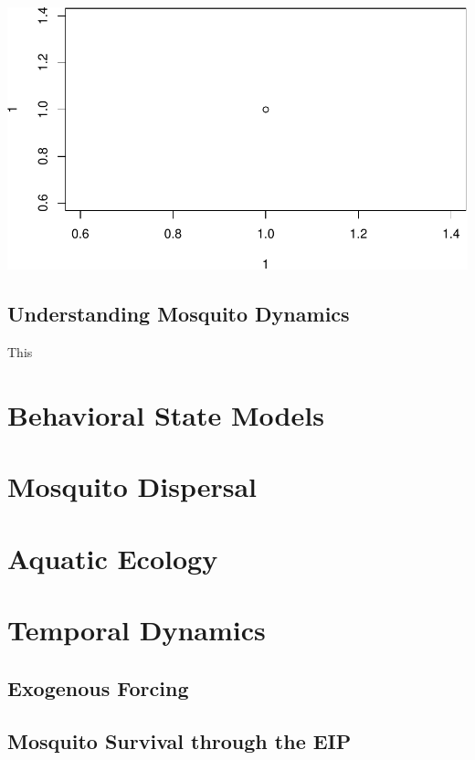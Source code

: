 \documentclass[
]{book}
\begin{document}
\includegraphics{docs/figs/test-1.pdf}

\section{Understanding Mosquito Dynamics}\label{understanding-mosquito-dynamics}

This

\chapter{Behavioral State Models}\label{behavioral-state-models}

\chapter{Mosquito Dispersal}\label{mosquito-dispersal}

\chapter{Aquatic Ecology}\label{aquatic-ecology}

\chapter{Temporal Dynamics}\label{temporal-dynamics}

\section{Exogenous Forcing}\label{exogenous-forcing-2}

\section{Mosquito Survival through the EIP}\label{mosquito-survival-through-the-eip}
\end{document}
